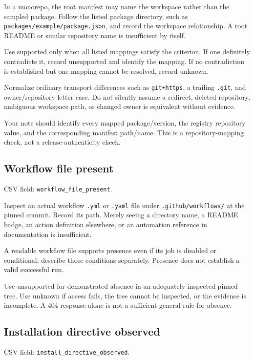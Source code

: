 \documentclass[11pt,a4paper]{article}
\begin{document}
In a monorepo, the root manifest may name the workspace rather than the sampled package. Follow the listed package directory, such as \nolinkurl{packages/example/package.json}, and record the workspace relationship. A root README or similar repository name is insufficient by itself.


Use supported only when all listed mappings satisfy the criterion. If one definitely contradicts it, record unsupported and identify the mapping. If no contradiction is established but one mapping cannot be resolved, record unknown.


Normalize ordinary transport differences such as \nolinkurl{git+https}, a trailing \nolinkurl{.git}, and owner/repository letter case. Do not silently assume a redirect, deleted repository, ambiguous workspace path, or changed owner is equivalent without evidence.


Your note should identify every mapped package/version, the registry repository value, and the corresponding manifest path/name. This is a repository-mapping check, not a release-authenticity check.


\subsection{Workflow file present}


CSV field: \nolinkurl{workflow_file_present}.


Inspect an actual workflow \nolinkurl{.yml} or \nolinkurl{.yaml} file under \nolinkurl{.github/workflows/} at the pinned commit. Record its path. Merely seeing a directory name, a README badge, an action definition elsewhere, or an automation reference in documentation is insufficient.


A readable workflow file supports presence even if its job is disabled or conditional; describe those conditions separately. Presence does not establish a valid successful run.


Use unsupported for demonstrated absence in an adequately inspected pinned tree. Use unknown if access fails, the tree cannot be inspected, or the evidence is incomplete. A 404 response alone is not a sufficient general rule for absence.


\subsection{Installation directive observed}


CSV field: \nolinkurl{install_directive_observed}.
\end{document}
